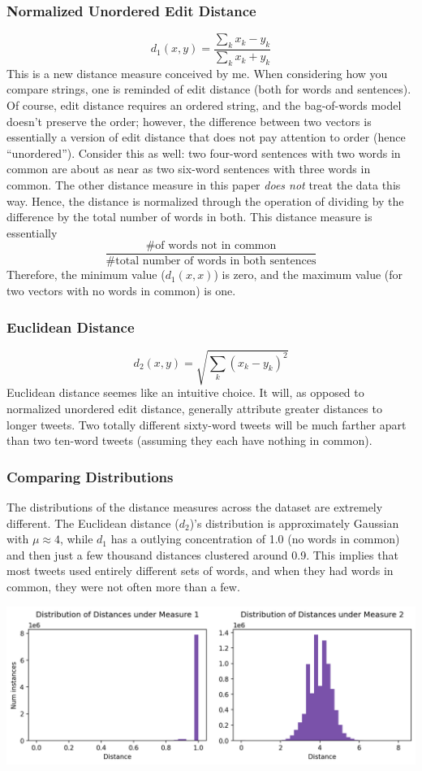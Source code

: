 \documentclass[fleqn]{article}
\begin{document}
\subsubsection{Normalized Unordered Edit Distance}
$$d_{1}(x,y)=\frac{\sum_{k}x_k-y_k}{\sum_{k}x_k+y_k}$$
This is a new distance measure conceived by me. When considering how you compare strings, one is reminded of edit distance (both for words and sentences).  Of course, edit distance requires an ordered string, and the bag-of-words model doesn't preserve the order; however, the difference between two vectors is essentially a version of edit distance that does not pay attention to order (hence ``unordered'').  Consider this as well: two four-word sentences with two words in common are about as near as two six-word sentences with three words in common. The other distance measure in this paper \textit{does not} treat the data this way.  Hence, the distance is normalized through the operation of dividing by the difference by the total number of words in both.  This distance measure is essentially $$\frac{\text{\# of words not in common}}{\text{\# total number of words in both sentences}}$$ Therefore, the minimum value ($d_{1}(x,x)$) is zero, and the maximum value (for two vectors with no words in common) is one.

\subsubsection{Euclidean Distance}
$$d_{2}(x,y)=\sqrt{\sum_{k}(x_k-y_k)^{2}}$$
Euclidean distance seemes like an intuitive choice. It will, as opposed to normalized unordered edit distance, generally attribute greater distances to longer tweets.  Two totally different sixty-word tweets will be much farther apart than two ten-word tweets (assuming they each have nothing in common).

\subsubsection{Comparing Distributions}
The distributions of the distance measures across the dataset are extremely different.  The Euclidean distance ($d_{2}$)'s distribution is approximately Gaussian with $\mu \approx 4$, while $d_{1}$ has a outlying concentration of 1.0 (no words in common) and then just a few thousand distances clustered around 0.9.  This implies that most tweets used entirely different sets of words, and when they had words in common, they were not often more than a few.
\begin{center}
	\includegraphics[scale=0.50]{images/distance_distributions_horizontal.png}
\end{center}
\end{document}
